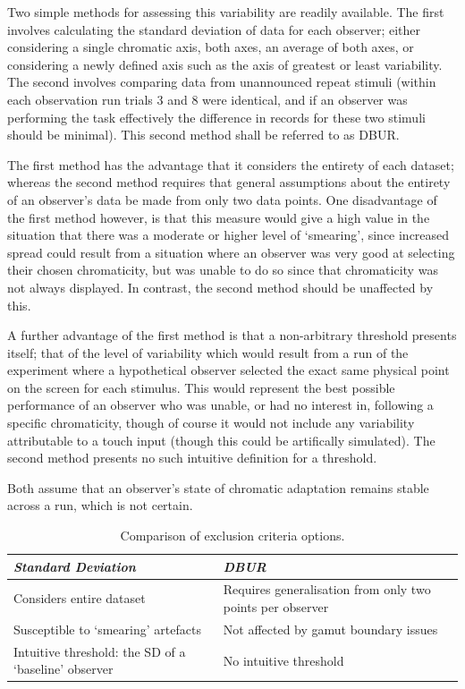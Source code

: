 Two simple methods for assessing this variability are readily available. The first involves calculating the standard deviation of data for each observer; either considering a single chromatic axis, both axes, an average of both axes, or considering a newly defined axis such as the axis of greatest or least variability. The second involves comparing data from unannounced repeat stimuli (within each observation run trials 3 and 8 were identical, and if an observer was performing the task effectively the difference in records for these two stimuli should be minimal). This second method shall be referred to as \acrfull{DBUR}.

The first method has the advantage that it considers the entirety of each dataset; whereas the second method requires that general assumptions about the entirety of an observer's data be made from only two data points. One disadvantage of the first method however, is that this measure would give a high value in the situation that there was a moderate or higher level of `smearing', since increased spread could result from a situation where an observer was very good at selecting their chosen chromaticity, but was unable to do so since that chromaticity was not always displayed. In contrast, the second method should be unaffected by this.

A further advantage of the first method is that a non-arbitrary threshold presents itself; that of the level of variability which would result from a run of the experiment where a hypothetical observer selected the exact same physical point on the screen for each stimulus. This would represent the best possible performance of an observer who was unable, or had no interest in, following a specific chromaticity, though of course it would not include any variability attributable to a touch input (though this could be artifically simulated). The second method presents no such intuitive definition for a threshold.

Both assume that an observer's state of chromatic adaptation remains stable across a run, which is not certain.

\begin{table}[hbtp]
\begin{tabular}{|p{}|p{}|}
\hline
\emph{Standard Deviation} & \emph{\acrshort{DBUR}} \\
\hline
Considers entire dataset & Requires generalisation from only two points per observer \\
\hline
Susceptible to `smearing' artefacts & Not affected by gamut boundary issues \\
\hline
Intuitive threshold: the SD of a `baseline' observer & No intuitive threshold \\
\hline
\end{tabular}
\caption{Comparison of exclusion criteria options.}
\label{tab:exclusion}
\end{table}

